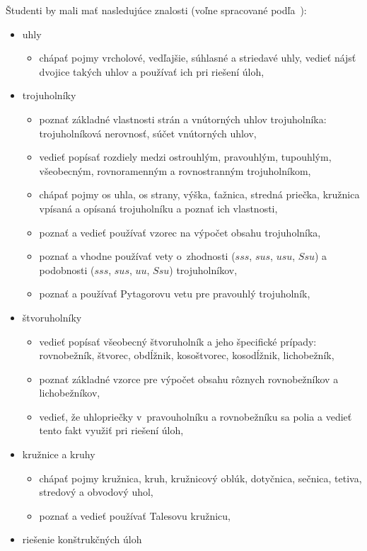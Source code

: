 {Študenti by mali mať nasledujúce znalosti (voľne spracované podľa~\cite{kubat2000}):
\begin{itemize}
\item uhly
\begin{itemize}
\item chápať pojmy vrcholové, vedľajšie, súhlasné a striedavé uhly, vedieť nájsť dvojice takých uhlov a používať ich pri riešení úloh,
\end{itemize}
\item trojuholníky
\begin{itemize}
\item poznať základné vlastnosti strán a vnútorných uhlov trojuholníka: trojuholníková nerovnosť, súčet vnútorných uhlov,
\item vedieť popísať rozdiely medzi ostrouhlým, pravouhlým, tupouhlým, všeobecným, rovnoramenným a rovnostranným trojuholníkom,
\item chápať pojmy os uhla, os strany, výška, ťažnica, stredná priečka, kružnica vpísaná a opísaná trojuholníku a poznať ich vlastnosti,
\item poznať a vedieť používať vzorec na výpočet obsahu trojuholníka,
\item poznať a vhodne používať vety o~zhodnosti ($sss$, $sus$, $usu$, $Ssu$) a podobnosti ($sss$, $sus$, $uu$, $Ssu$) trojuholníkov,
\item poznať a používať Pytagorovu vetu pre pravouhlý trojuholník,
\end{itemize}
\item štvoruholníky
\begin{itemize}
\item vedieť popísať všeobecný štvoruholník a jeho špecifické prípady: rovnobežník, štvorec, obdĺžnik, kosoštvorec, kosodĺžnik, lichobežník,
\item poznať základné vzorce pre výpočet obsahu rôznych rovnobežníkov a lichobežníkov,
\item vedieť, že uhlopriečky v~pravouholníku a rovnobežníku sa polia a vedieť tento fakt využiť pri riešení úloh,
\end{itemize}
\item kružnice a kruhy
\begin{itemize}
\item chápať pojmy kružnica, kruh, kružnicový oblúk, dotyčnica, sečnica, tetiva, stredový a obvodový uhol,
\item poznať a vedieť používať Talesovu kružnicu,
\end{itemize}
\item riešenie konštrukčných úloh

\end{itemize}}
